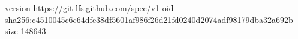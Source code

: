 version https://git-lfs.github.com/spec/v1
oid sha256:c4510045c6c64dfe38df5601af986f26d21fd0240d2074adf98179dba32a692b
size 148643
